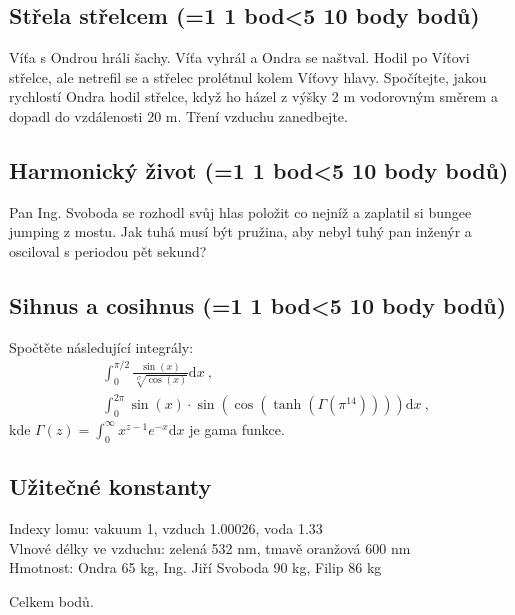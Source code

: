 \documentclass[10pt,a4paper,landscape,twocolumn]{article}
\newcounter{bodycounter}
\newcommand{\bodystring}[1]{\ifnum #1=1 1 bod\else\ifnum #1<5 #1 body\else #1 bodů\fi\fi}
\newcommand{\uloha}[3]{
\subsection{#1 (\bodystring{#2})}
#3\addtocounter{bodycounter}{#2}}
\begin{document}
\uloha{Střela střelcem}{10}{
Víťa s Ondrou hráli šachy. Víťa vyhrál a Ondra se naštval. Hodil po Víťovi střelce, ale netrefil se a střelec prolétnul kolem Víťovy hlavy. Spočítejte, jakou rychlostí Ondra hodil střelce, když ho házel z výšky 2 m vodorovným směrem a dopadl do vzdálenosti 20 m. Tření vzduchu zanedbejte.
}

\uloha{Harmonický život}{10}{
Pan Ing. Svoboda se rozhodl svůj hlas položit co nejníž a zaplatil si bungee jumping z mostu. Jak tuhá musí být pružina, aby nebyl tuhý pan inženýr a osciloval s periodou pět sekund?
}

\uloha{Sihnus a cosihnus}{10}{
Spočtěte následující integrály:
\begin{subequations}
\begin{align}
&\int_0^{\pi/2} \frac{\sin\left(x\right)}{\sqrt[17]{\cos\left(x\right)}}\mathrm{d} x ~,\\
&\int_0^{2\pi} \sin\left(x\right)\cdot\sin\left(\cos\left(\tanh\left(\Gamma\left(\pi^{14}\right)\right)\right)\right)\mathrm{d} x ~,
\end{align}
\end{subequations}
kde $\Gamma\left(z\right) = \int_0^\infty x^{z-1}e^{-x}\mathrm{d}x$ je gama funkce.
}


\subsection*{Užitečné konstanty}
Indexy lomu: vakuum 1, vzduch 1.00026, voda 1.33 \\
Vlnové délky ve vzduchu: zelená 532 nm, tmavě oranžová 600 nm\\
Hmotnost: Ondra 65 kg, Ing. Jiří Svoboda 90 kg, Filip 86 kg

\newpage Celkem  bodů.
\end{document}
